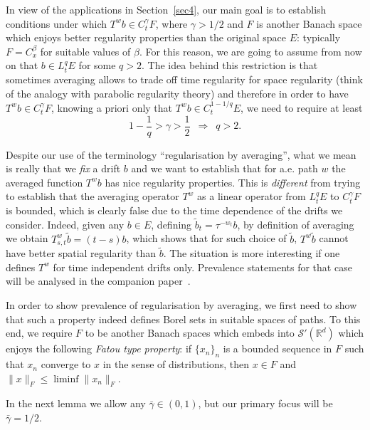 \documentclass[10pt]{article}
\newcommand{\tmem}[1]{{\em #1\/}}
\newcommand{\tmtextit}[1]{{\itshape{#1}}}
\begin{document}
In view of the applications in Section~\ref{sec4}, our main goal is to
establish conditions under which $T^w b \in C^{\gamma}_t F$, where $\gamma > 1
/ 2$ and $F$ is another Banach space which enjoys better regularity properties
than the original space $E$: typically $F = C^{\beta}_x$ for suitable values
of $\beta$. For this reason, we are going to assume from now on that $b \in
L^q_t E$ for some $q > 2$. The idea behind this restriction is that sometimes
averaging allows to trade off time regularity for space regularity (think of
the analogy with parabolic regularity theory) and therefore in order to have
$T^w b \in C^{\gamma}_t F$, knowing a priori only that $T^w b \in C^{1 - 1 /
q}_t E$, we need to require at least
\[ 1 - \frac{1}{q} > \gamma > \frac{1}{2}  \enspace \Rightarrow \enspace q >
   2. \]
\begin{remark}
  \label{sec3.1 remark limitation}Despite our use of the terminology
  ``regularisation by averaging'', what we mean is really that we
  \tmtextit{fix} a drift $b$ and we want to establish that for a.e. path $w$
  the averaged function $T^w b$ has nice regularity properties. This is
  \tmtextit{different} from trying to establish that the averaging operator
  $T^w$ as a linear operator from $L^q_t E$ to $C^{\gamma}_t F$ is bounded,
  which is clearly false due to the time dependence of the drifts we consider.
  Indeed, given any $b \in E$, defining $\tilde{b}_t = \tau^{- w_t} b$, by
  definition of averaging we obtain $T_{s, t}^w \tilde{b} = (t - s) b$, which
  shows that for such choice of $\tilde{b}$, $T^w \tilde{b}$ cannot have
  better spatial regularity than $\tilde{b}$. The situation is more
  interesting if one defines $T^w$ for time independent drifts only.
  Prevalence statements for that case will be analysed in the companion
  paper~{\cite{galeatigubinelli}}.
\end{remark}

In order to show prevalence of regularisation by averaging, we first need to
show that such a property indeed defines Borel sets in suitable spaces of
paths. To this end, we require $F$ to be another Banach spaces which embeds
into $\mathcal{S}' (\mathbb{R}^d)$ which enjoys the following {\tmem{Fatou
type property}}: if $\{ x_n \}_n$ is a bounded sequence in $F$ such that $x_n$
converge to $x$ in the sense of distributions, then $x \in F$ and $\| x \|_F
\leqslant \liminf \| x_n \|_F$.

In the next lemma we allow any $\bar{\gamma} \in (0, 1)$, but our primary
focus will be $\bar{\gamma} = 1 / 2$.
\end{document}
